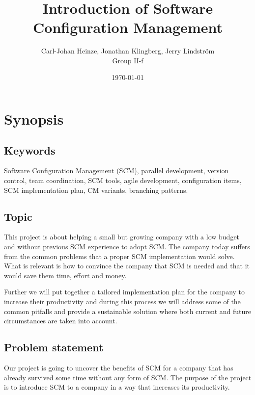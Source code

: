 \documentclass{article}
\title{Introduction of Software Configuration Management}
\author{Carl-Johan Heinze, Jonathan Klingberg, Jerry Lindström \\Group II-f}
\date{\today}
\begin{document}
\maketitle

\section{Synopsis}

\subsection{Keywords}
Software Configuration Management (SCM), parallel development, version control, team coordination, SCM tools, agile development, configuration items, SCM implementation plan, CM variants, branching patterns.
\mbox{} \\

\subsection{Topic}
This project is about helping a small but growing company with a low budget and without previous SCM experience to adopt SCM. The company today suffers from the common problems that a proper SCM implementation would solve. What is relevant is how to convince the company that SCM is needed and that it would save them time, effort and money. 

\noindent Further we will put together a tailored implementation plan for the company to increase their productivity and during this process we will address some of the common pitfalls and provide a sustainable solution where both current and future circumstances are taken into account.
\mbox{} \\

\subsection{Problem statement}
Our project is going to uncover the benefits of SCM for a company that has already survived some time without any form of SCM. The purpose of the project is to introduce SCM to a company in a way that increases its productivity.\mbox{} \\
\end{document}
